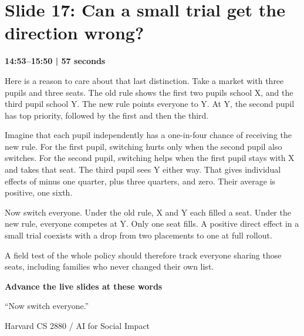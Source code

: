 \documentclass[11pt]{article}
\begin{document}
\section*{Slide 17: Can a small trial get the direction wrong?}
{\color{navy}\textbf{14:53--15:50 | 57 seconds}}\par\medskip
Here is a reason to care about that last distinction. Take a market with three pupils and three seats. The old rule shows the first two pupils school X, and the third pupil school Y. The new rule points everyone to Y. At Y, the second pupil has top priority, followed by the first and then the third.
\par
Imagine that each pupil independently has a one-in-four chance of receiving the new rule. For the first pupil, switching hurts only when the second pupil also switches. For the second pupil, switching helps when the first pupil stays with X and takes that seat. The third pupil sees Y either way. That gives individual effects of minus one quarter, plus three quarters, and zero. Their average is positive, one sixth.
\par
Now switch everyone. Under the old rule, X and Y each filled a seat. Under the new rule, everyone competes at Y. Only one seat fills. A positive direct effect in a small trial coexists with a drop from two placements to one at full rollout.
\par
A field test of the whole policy should therefore track everyone sharing those seats, including families who never changed their own list.
\par
\vfill{\small\textbf{Advance the live slides at these words}\par}
{\small ``Now switch everyone.''}\par
\newpage
{\small Harvard CS 2880 / AI for Social Impact}\par
\end{document}
